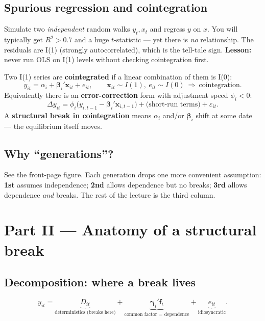 \documentclass[11pt,a4paper]{article}
\newcommand{\Ito}{I(1)}
\newcommand{\Izero}{I(0)}
\newcommand{\hlt}[2]{\textcolor{#1}{\textbf{#2}}}
\newcommand{\bbeta}{\boldsymbol{\beta}}
\newcommand{\bgamma}{\boldsymbol{\gamma}}
\newcommand{\bx}{\mathbf{x}}
\newcommand{\bff}{\mathbf{f}}
\theoremstyle{definition}
\begin{document}
\subsection{Spurious regression and cointegration}
\begin{exbox}
Simulate two \emph{independent} random walks $y_t,x_t$ and regress $y$ on $x$. You will typically get
$R^2>0.7$ and a huge $t$-statistic --- yet there is \emph{no} relationship. The residuals are \Ito{}
(strongly autocorrelated), which is the tell-tale sign. \textbf{Lesson:} never run OLS on \Ito{}
levels without checking cointegration first.
\end{exbox}
Two \Ito{} series are \hlt{cteal}{cointegrated} if a linear combination of them is \Izero:
\begin{equation}
y_{it}=\alpha_i+\bbeta_i'\bx_{it}+e_{it},\qquad \bx_{it}\sim\Ito,\ e_{it}\sim\Izero
\ \Rightarrow\ \text{cointegration.}
\end{equation}
Equivalently there is an \hlt{camber}{error-correction} form with adjustment speed $\phi_i<0$:
\begin{equation}
\Delta y_{it}=\phi_i\big(y_{i,t-1}-\bbeta_i'\bx_{i,t-1}\big)+\text{(short-run terms)}+\varepsilon_{it}.
\end{equation}
A \hlt{camber}{structural break in cointegration} means $\alpha_i$ and/or $\bbeta_i$ shift at some
date --- the equilibrium itself moves.

\subsection{Why ``generations''?}
See the front-page figure. Each generation drops one more convenient assumption:
\hlt{cblue}{1st} assumes independence; \hlt{ccyan}{2nd} allows dependence but no breaks;
\hlt{cgrape}{3rd} allows dependence \emph{and} breaks. The rest of the lecture is the third column.

\section{Part II --- Anatomy of a structural break}

\subsection{Decomposition: where a break lives}
\begin{eqbox}
\[
y_{it}=\underbrace{D_{it}}_{\text{deterministics (breaks here)}}
+\underbrace{\bgamma_i'\bff_t}_{\text{common factor = dependence}}
+\underbrace{e_{it}}_{\text{idiosyncratic}} .
\]
\end{eqbox}
\end{document}
